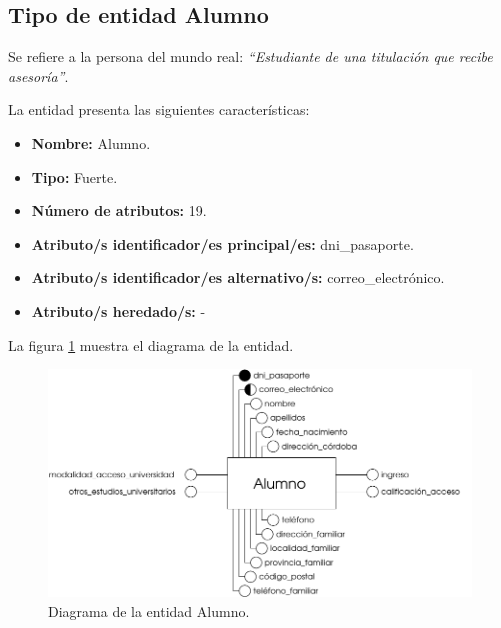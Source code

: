 \subsection{Tipo de entidad Alumno}

   \begin{description}

   \item[Definición] Se refiere a la persona del mundo real: \emph{``Estudiante
        de una titulación que recibe asesoría''}.

   \item[Características] La entidad presenta las siguientes características:
      \begin{itemize}
         \item \textbf{Nombre:} Alumno.
         \item \textbf{Tipo:} Fuerte.
         \item \textbf{Número de atributos:} 19.
         \item \textbf{Atributo/s identificador/es principal/es:} dni\_pasaporte.
         \item \textbf{Atributo/s identificador/es alternativo/s:} correo\_electrónico.
         \item \textbf{Atributo/s heredado/s:} -
      \end{itemize}

   \item[Diagrama] La figura \ref{diagramaAlumno} muestra el diagrama de la entidad.
   \item \begin{figure}[!ht]
            \begin{center}
            \includegraphics[]{07.Modelo_Entidad-Interrelacion/7.2.Analisis_Entidades/diagramas/alumno.pdf}
            \caption{Diagrama de la entidad Alumno.}
            \label{diagramaAlumno}
            \end{center}
         \end{figure}


\end{description}
